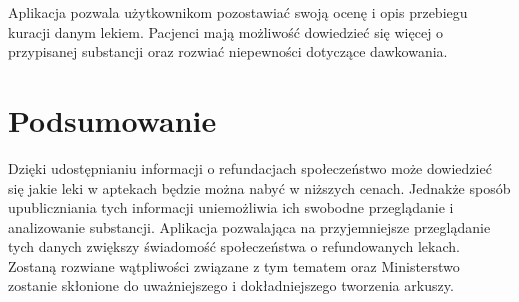 \documentclass{article}
\begin{document}
  Aplikacja pozwala użytkownikom pozostawiać swoją ocenę i opis przebiegu kuracji danym lekiem.
  Pacjenci mają możliwość dowiedzieć się więcej o przypisanej substancji oraz rozwiać niepewności dotyczące dawkowania.


  \section{Podsumowanie}

  Dzięki udostępnianiu informacji o refundacjach społeczeństwo może dowiedzieć się jakie leki w aptekach będzie można nabyć w niższych cenach.
  Jednakże sposób upubliczniania tych informacji uniemożliwia ich swobodne przeglądanie i analizowanie substancji.
  Aplikacja pozwalająca na przyjemniejsze przeglądanie tych danych zwiększy świadomość społeczeństwa o refundowanych lekach.
  Zostaną rozwiane wątpliwości związane z tym tematem oraz Ministerstwo zostanie skłonione do uważniejszego i dokładniejszego tworzenia arkuszy.
\end{document}
